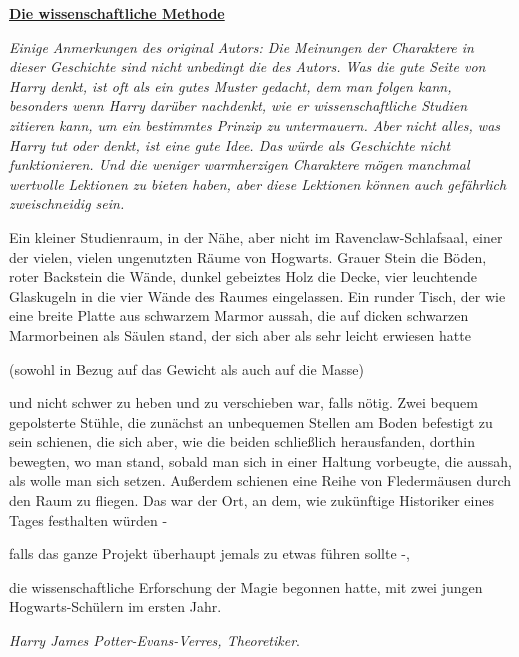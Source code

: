 

\hypertarget{die-wissenschaftliche-methode}{%

\textbf{\uline{Die wissenschaftliche Methode}}

\emph{Einige Anmerkungen des original Autors: Die Meinungen der Charaktere in dieser Geschichte sind nicht unbedingt die des Autors. Was die gute Seite von Harry denkt, ist oft als ein gutes Muster gedacht, dem man folgen kann, besonders wenn Harry darüber nachdenkt, wie er wissenschaftliche Studien zitieren kann, um ein bestimmtes Prinzip zu untermauern. Aber nicht alles, was Harry tut oder denkt, ist eine gute Idee. Das würde als Geschichte nicht funktionieren. Und die weniger warmherzigen Charaktere mögen manchmal wertvolle Lektionen zu bieten haben, aber diese Lektionen können auch gefährlich zweischneidig sein.}

Ein kleiner Studienraum, in der Nähe, aber nicht im Ravenclaw-Schlafsaal, einer der vielen, vielen ungenutzten Räume von Hogwarts. Grauer Stein die Böden, roter Backstein die Wände, dunkel gebeiztes Holz die Decke, vier leuchtende Glaskugeln in die vier Wände des Raumes eingelassen. Ein runder Tisch, der wie eine breite Platte aus schwarzem Marmor aussah, die auf dicken schwarzen Marmorbeinen als Säulen stand, der sich aber als sehr leicht erwiesen hatte

(sowohl in Bezug auf das Gewicht als auch auf die Masse)

und nicht schwer zu heben und zu verschieben war, falls nötig. Zwei bequem gepolsterte Stühle, die zunächst an unbequemen Stellen am Boden befestigt zu sein schienen, die sich aber, wie die beiden schließlich herausfanden, dorthin bewegten, wo man stand, sobald man sich in einer Haltung vorbeugte, die aussah, als wolle man sich setzen. Außerdem schienen eine Reihe von Fledermäusen durch den Raum zu fliegen. Das war der Ort, an dem, wie zukünftige Historiker eines Tages festhalten würden -

falls das ganze Projekt überhaupt jemals zu etwas führen sollte -,

die wissenschaftliche Erforschung der Magie begonnen hatte, mit zwei jungen Hogwarts-Schülern im ersten Jahr.

\emph{Harry James Potter-Evans-Verres, Theoretiker}.

}
